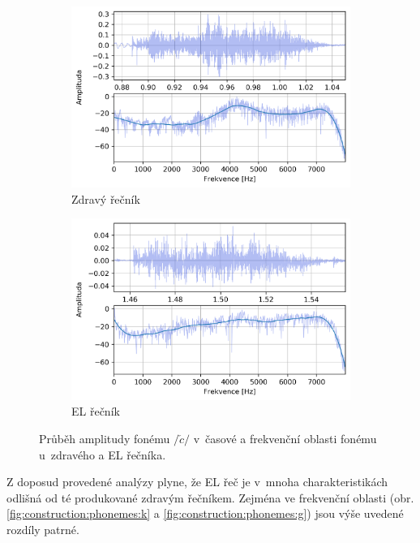 \begin{figure}[htpb]
  \centering
  \begin{subfigure}[b]{0.45\textwidth}
    \includegraphics[width=\textwidth]{./ch5-construction/img/signal-normal_c.png}
    \caption{Zdravý řečník}
    \label{fig:construction:phonemes:c:normal}
  \end{subfigure}
  \begin{subfigure}[b]{0.45\textwidth}
    \includegraphics[width=\textwidth]{./ch5-construction/img/signal-el_c.png}
    \caption{EL řečník}
    \label{fig:construction:phonemes:c:el}
  \end{subfigure}
  \caption[Průběh amplitudy fonému $/\check{c}/$ zdravého a EL řečníka.]{Průběh amplitudy fonému $/\check{c}/$ v~časové a frekvenční oblasti fonému u~zdravého a EL řečníka.}
  \label{fig:construction:phonemes:c}
\end{figure}

Z doposud provedené analýzy plyne, že EL řeč je v~mnoha charakteristikách odlišná od té produkované zdravým řečníkem.
Zejména ve frekvenční oblasti (obr. \ref{fig:construction:phonemes:k} a \ref{fig:construction:phonemes:g}) jsou výše uvedené rozdíly patrné.

